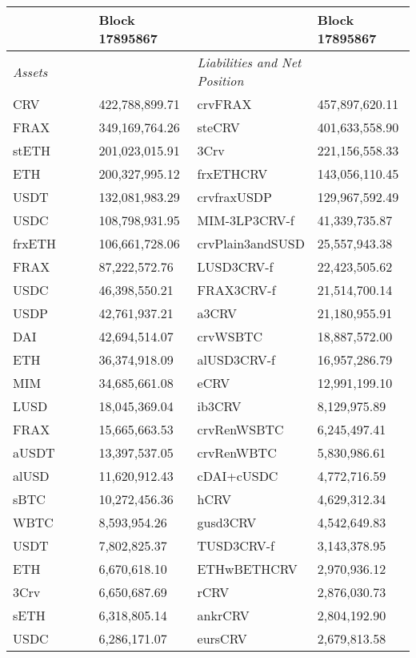 
\begin{longtable}{@{}p{0.25\linewidth}p{0.25\linewidth}p{0.25\linewidth}p{0.25\linewidth}@{}}

\toprule


& Block 17895867 & & Block 17895867 \\

\midrule
\textit{Assets} & & \textit{Liabilities and Net Position} \\
CRV & 422,788,899.71 & crvFRAX &457,897,620.11 \\
FRAX & 349,169,764.26 & steCRV &401,633,558.90 \\
stETH & 201,023,015.91 & 3Crv &221,156,558.33 \\
ETH & 200,327,995.12 & frxETHCRV &143,056,110.45 \\
USDT & 132,081,983.29 & crvfraxUSDP &129,967,592.49 \\
USDC & 108,798,931.95 & MIM-3LP3CRV-f &41,339,735.87 \\
frxETH & 106,661,728.06 & crvPlain3andSUSD &25,557,943.38 \\
FRAX & 87,222,572.76 & LUSD3CRV-f &22,423,505.62 \\
USDC & 46,398,550.21 & FRAX3CRV-f &21,514,700.14 \\
USDP & 42,761,937.21 & a3CRV &21,180,955.91 \\
DAI & 42,694,514.07 & crvWSBTC &18,887,572.00 \\
ETH & 36,374,918.09 & alUSD3CRV-f &16,957,286.79 \\
MIM & 34,685,661.08 & eCRV &12,991,199.10 \\
LUSD & 18,045,369.04 & ib3CRV &8,129,975.89 \\
FRAX & 15,665,663.53 & crvRenWSBTC &6,245,497.41 \\
aUSDT & 13,397,537.05 & crvRenWBTC &5,830,986.61 \\
alUSD & 11,620,912.43 & cDAI+cUSDC &4,772,716.59 \\
sBTC & 10,272,456.36 & hCRV &4,629,312.34 \\
WBTC & 8,593,954.26 & gusd3CRV &4,542,649.83 \\
USDT & 7,802,825.37 & TUSD3CRV-f &3,143,378.95 \\
ETH & 6,670,618.10 & ETHwBETHCRV &2,970,936.12 \\
3Crv & 6,650,687.69 & rCRV &2,876,030.73 \\
sETH & 6,318,805.14 & ankrCRV &2,804,192.90 \\
USDC & 6,286,171.07 & eursCRV &2,679,813.58 \\

\end{longtable}
